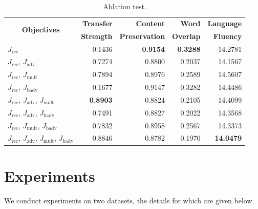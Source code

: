 \documentclass[11pt,a4paper]{article}
\newcommand{\tabc}[2]{\multicolumn{1}{|c|}{\multirow{#1}{*}{\textbf{#2}}}} %
\newcommand{\loss}[1]{J_\text{#1}}
\begin{document}
\begin{table}[ht]
	\centering
	\begin{tabular}{| l | r | r | r | r |}
		\hline
		\tabc{2}{Objectives}                                     & \textbf{Transfer} & \textbf{Content}      & \textbf{Word}    & \textbf{Language} \\
		                                                         & \textbf{Strength} & \textbf{Preservation} & \textbf{Overlap} & \textbf{Fluency}  \\
		\hline
		\hline
		$\loss{rec}$                                             & 0.1436            & \textbf{0.9154}       & \textbf{0.3288}  & 14.2781           \\
		\hline
		$\loss{rec}$, $\loss{adv}$                               & 0.7274            & 0.8800                & 0.2037           & 14.1567           \\
		\hline
		$\loss{rec}$, $\loss{mult}$                              & 0.7894            & 0.8976                & 0.2589           & 14.5607           \\
		\hline
		$\loss{rec}$, $\loss{badv}$                              & 0.1677            & 0.9147                & 0.3282           & 14.4486           \\
		\hline
		$\loss{rec}$, $\loss{adv}$, $\loss{mult}$                & \textbf{0.8903}   & 0.8824                & 0.2105           & 14.4099           \\
		\hline
		$\loss{rec}$, $\loss{adv}$, $\loss{badv}$                & 0.7491            & 0.8827                & 0.2022           & 14.3568           \\
		\hline
		$\loss{rec}$, $\loss{mult}$, $\loss{badv}$               & 0.7832            & 0.8958                & 0.2567           & 14.3373           \\
		\hline
		$\loss{rec}$, $\loss{adv}$, $\loss{mult}$, $\loss{badv}$ & 0.8846            & 0.8782                & 0.1970           & \textbf{14.0479}  \\
		\hline
	\end{tabular}
	\caption{Ablation test.}
	\label{tab:ablation-results}
\end{table}

\section{Experiments}

We conduct experiments on two datasets, the details for which are given below.
\end{document}
